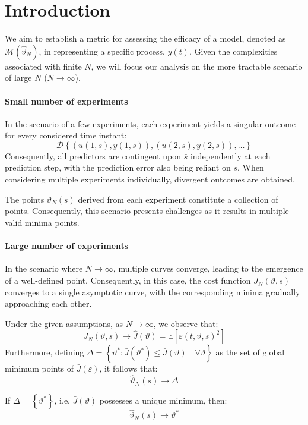 \section{Introduction}

We aim to establish a metric for assessing the efficacy of a model, denoted as $\mathcal{M}(\hat{\vartheta}_N)$, in representing a specific process, $y(t)$.
Given the complexities associated with finite $N$, we will focus our analysis on the more tractable scenario of large $N$ ($N \rightarrow \infty$).

\paragraph*{Small number of experiments}
In the scenario of a few experiments, each experiment yields a singular outcome for every considered time instant:
\[\mathcal{D}\left\{ \left( u(1,\bar{s}),y(1,\bar{s}) \right), \left( u(2,\bar{s}),y(2,\bar{s}) \right),\dots \right\}\]
Consequently, all predictors are contingent upon $\bar{s}$ independently at each prediction step, with the prediction error also being reliant on $\bar{s}$. 
When considering multiple experiments individually, divergent outcomes are obtained.

The points $\hat{\vartheta}_N(s)$ derived from each experiment constitute a collection of points. 
Consequently, this scenario presents challenges as it results in multiple valid minima points.

\paragraph*{Large number of experiments}
In the scenario where $N\rightarrow\infty$, multiple curves converge, leading to the emergence of a well-defined point.
Consequently, in this case, the cost function $J_N(\vartheta,s)$ converges to a single asymptotic curve, with the corresponding minima gradually approaching each other.

\begin{theorem}
    Under the given assumptions, as $N\rightarrow\infty$, we observe that:
    \[J_N(\vartheta,s)\rightarrow\hat{J}(\vartheta)=\mathbb{E}\left[\varepsilon(t,\vartheta,s)^2\right]\]
    Furthermore, defining $\Delta=\left\{ \vartheta^\ast: \bar{J}(\vartheta^\ast) \leq \bar{J}(\vartheta) \quad \forall\vartheta\right\}$ as the set of global minimum points of $\bar{J}(\varepsilon)$, it follows that:
    \[\hat{\vartheta}_N(s)\rightarrow \Delta\]
\end{theorem}
\begin{corollary}
    If $\Delta=\left\{ \vartheta^\ast \right\}$, i.e. $\bar{J}(\vartheta)$ possesses a unique minimum, then:
    \[\hat{\vartheta}_N(s)\rightarrow\vartheta^\ast\]
\end{corollary}

